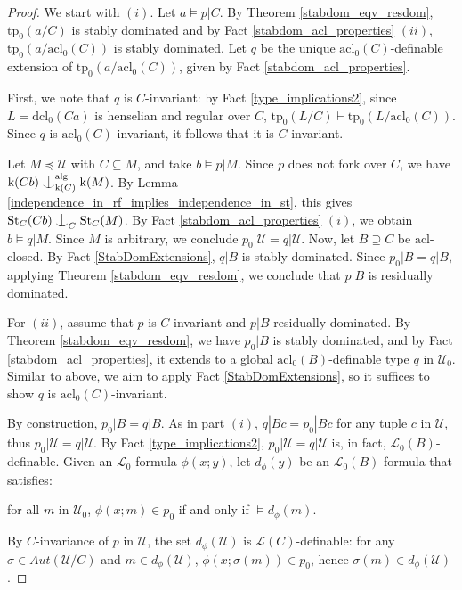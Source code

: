 \documentclass[12pt]{article}
\newcommand{\tpp}{\mathrm{tp}}
\newcommand{\acl}{\mathrm{acl}}
\newcommand{\dcl}{\mathrm{dcl}}
\newcommand{\alg}{\mathrm{alg}}
\newcommand{\st}{\mathrm{St}}
\newcommand{\0}{\emptyset}
\newcommand{\rf}{\mathrm{k}}
\newcommand{\U}{\mathcal{U}}
\newcommand{\Ualg}{\mathcal{U}_0}
\def\forkindep{\mathrel{\raise0.2ex\hbox{\ooalign{\hidewidth$\vert$\hidewidth\cr\raise-0.9ex\hbox{$\smile$}}}}}
\theoremstyle{plain}%
\theoremstyle{definition}
\theoremstyle{remark}
\begin{document}
 \begin{proof} We start with $(i)$. Let $a \models p | C$. By Theorem \ref{stabdom_eqv_resdom}, $\tpp_0(a/C)$ is stably dominated and by Fact \ref{stabdom_acl_properties} $(ii)$, $\tpp_0(a/\acl_0(C))$ is stably dominated. 
 Let $q$ be the unique $\acl_0(C)$-definable extension of $\tpp_0(a/\acl_0(C))$, given by Fact \ref{stabdom_acl_properties}. %

First, we note that $q$ is $C$-invariant: by Fact \ref{type_implications2}, since  $L = \dcl_0(Ca)$ is henselian and regular over $C$, $\tpp_0(L/C) \vdash \tpp_0(L/\acl_0(C))$. Since $q$ is $\acl_0(C)$-invariant, it follows that it is $C$-invariant.

Let $M \preceq\U$ with $C\subseteq M$, and take $b \models p | M$. Since $p$ does not fork over $C$, we have $\rf(Cb) \forkindep_{\rf(C)}^{\alg} \rf(M)$. By Lemma \ref{independence_in_rf_implies_independence_in_st}, this gives $\st_C(Cb)\forkindep_C\st_C(M)$. By Fact \ref{stabdom_acl_properties} $(i)$, we obtain $b\models q|M$. Since $M$ is arbitrary, we conclude $p_0|\U= q|\U$. Now, let $B\supseteq C$ be $\acl$-closed. By Fact \ref{StabDomExtensions}, $q|B$ is stably dominated. Since $p_0|B=q|B$, applying Theorem \ref{stabdom_eqv_resdom}, we conclude that $p | B$ is residually dominated.

For $(ii)$, assume that $p$ is $C$-invariant and $p|B$ residually dominated. By Theorem \ref{stabdom_eqv_resdom}, we have $p_0|B$ is stably dominated, and by Fact \ref{stabdom_acl_properties}, it extends to a global $\acl_0(B)$-definable type $q$ in $\Ualg$. Similar to above, we aim to apply Fact \ref{StabDomExtensions}, so it suffices to show $q$ is $\acl_0(C)$-invariant. 

By construction, $p_0|B=q|B$. As in part $(i)$, $q|Bc=p_0|Bc$ for any tuple $c$ in $\U$, thus $p_0|\U=q|\U$. By Fact \ref{type_implications2}, $p_0|\U=q|\U$ is, in fact, $\mathcal{L}_0(B)$-definable. Given an $\mathcal{L}_0$-formula $\phi(x;y)$, let $d_{\phi}(y)$ be an $\mathcal{L}_0(B)$-formula that satisfies:
\begin{center}
    for all $m$ in $\Ualg$, $\phi(x;m)\in p_0$ if and only if $\models d_{\phi}(m)$.
\end{center}
By $C$-invariance of $p$ in $\U$, the set $d_{\phi}(\U)$ is $\mathcal{L}(C)$-definable: 
for any $\sigma\in Aut(\U/C)$ and $m\in d_{\phi}(\U)$, $\phi(x;\sigma(m))\in p_0$, hence $\sigma(m)\in d_{\phi}(\U)$.


\end{proof}
\end{document}
